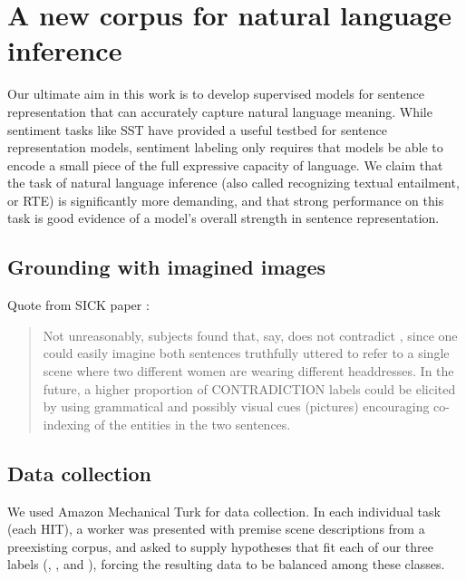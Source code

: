\section{A new corpus for natural language inference}\label{sec:discussion}


Our ultimate aim in this work is to develop supervised models for sentence representation that can accurately capture natural language meaning. While sentiment tasks like SST have provided a useful testbed for sentence representation models, sentiment labeling only requires that models be able to encode a small piece of the full expressive capacity of language. We claim that the task of natural language inference (also called recognizing textual entailment, or RTE) is significantly more demanding, and that strong performance on this task is good evidence of a model's overall strength in sentence representation.

\subsection{Grounding with imagined images}


Quote from SICK paper \cite{marelli2014sick}:

\begin{quote}
Not unreasonably, subjects found that, say,  does not contradict , since one could easily imagine both sentences truthfully uttered to refer to a single scene where two different women are wearing different headdresses. In the future, a higher proportion of CONTRADICTION labels could be elicited by using grammatical and possibly visual cues (pictures) encouraging co-indexing of the entities in the two sentences.
\end{quote}


\subsection{Data collection}

We used Amazon Mechanical Turk for data collection. In each individual task (each HIT), a worker was presented with premise scene descriptions from a preexisting corpus, and asked to supply hypotheses that fit each of our three labels (, , and ), forcing the resulting data to be balanced among these classes.

